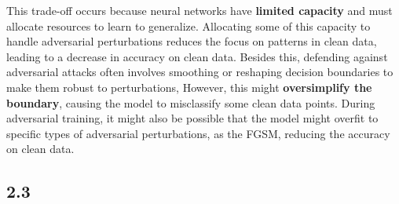 \documentclass{article}
\begin{document}
This trade-off occurs because neural networks have \textbf{limited capacity} and must allocate resources to learn to generalize.
Allocating some of this capacity to handle adversarial perturbations reduces the focus on patterns in clean data, leading to a decrease in accuracy on clean data.
Besides this, defending against adversarial attacks often involves smoothing or reshaping decision boundaries to make them robust to perturbations, However, this might \textbf{oversimplify the boundary}, causing the model to misclassify some clean data points.
During adversarial training, it might also be possible that the model might overfit to specific types of adversarial perturbations, as the FGSM, reducing the accuracy on clean data.


\newpage
\subsection*{2.3}
\end{document}

